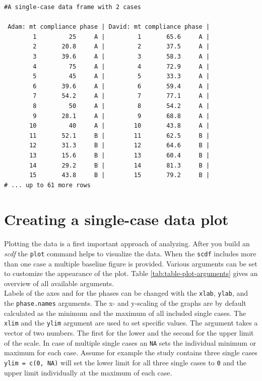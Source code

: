 \documentclass[
]{book}
\begin{document}
\begin{verbatim}
#A single-case data frame with 2 cases

 Adam: mt compliance phase | David: mt compliance phase |
        1         25     A |         1       65.6     A |
        2       20.8     A |         2       37.5     A |
        3       39.6     A |         3       58.3     A |
        4         75     A |         4       72.9     A |
        5         45     A |         5       33.3     A |
        6       39.6     A |         6       59.4     A |
        7       54.2     A |         7       77.1     A |
        8         50     A |         8       54.2     A |
        9       28.1     A |         9       68.8     A |
       10         40     A |        10       43.8     A |
       11       52.1     B |        11       62.5     B |
       12       31.3     B |        12       64.6     B |
       13       15.6     B |        13       60.4     B |
       14       29.2     B |        14       81.3     B |
       15       43.8     B |        15       79.2     B |
# ... up to 61 more rows
\end{verbatim}

\hypertarget{creating-a-single-case-data-plot}{%
\chapter{Creating a single-case data plot}\label{creating-a-single-case-data-plot}}

Plotting the data is a first important approach of analyzing. After you build an \emph{scdf} the \texttt{plot} command helps to visualize the data. When the \texttt{scdf} includes more than one case a multiple baseline figure is provided. Various arguments can be set to customize the appearance of the plot. Table \ref{tab:table-plot-arguments} gives an overview of all available arguments.\\
Labels of the axes and for the phases can be changed with the \texttt{xlab}, \texttt{ylab}, and the \texttt{phase.names} arguments. The x- and y-scaling of the graphs are by default calculated as the minimum and the maximum of all included single cases. The \texttt{xlim} and the \texttt{ylim} argument are used to set specific values. The argument takes a vector of two numbers. The first for the lower and the second for the upper limit of the scale. In case of multiple single cases an \texttt{NA} sets the individual minimum or maximum for each case. Assume for example the study contains three single cases \texttt{ylim\ =\ c(0,\ NA)} will set the lower limit for all three single cases to \texttt{0} and the upper limit individually at the maximum of each case.
\end{document}
